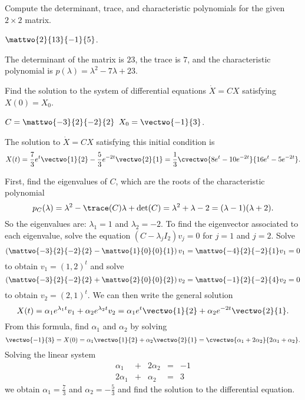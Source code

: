 \documentclass{article}
\begin{document}



\problemlabel

\noindent Compute the determinant, trace, and characteristic polynomials for the given  $2\times 2$ matrix.

\begin{exercise} \label{c6.4.1b}
$\mattwo{2}{13}{-1}{5}$.

\begin{solution}
The determinant of the matrix is $23$, the trace is $7$, and
the characteristic polynomial is $p(\lambda)=\lambda^2-7\lambda+23$.

\end{solution}
\end{exercise}





\problemlabel

\noindent Find the solution to the system of differential equations $\dot{X} = CX$ satisfying $X(0)=X_0$.

\begin{exercise}  \label{c4.10A.1c}
$C = \mattwo{-3}{2}{-2}{2}$ \AND $X_0 = \vectwo{-1}{3}$.

\begin{solution}
\ans The solution to $\dot{X} = CX$ satisfying this
initial condition is
\[
X(t) = \frac{7}{3}e^t\vectwo{1}{2} - \frac{5}{3}e^{-2t}\vectwo{2}{1}
= \frac{1}{3}\cvectwo{8e^t - 10e^{-2t}}{16e^t - 5e^{-2t}}.
\]

\soln First, find the eigenvalues of $C$, which are the roots of the
characteristic polynomial
\[
p_C(\lambda) = \lambda^2 - \trace(C)\lambda + \det(C) =
\lambda^2 + \lambda - 2 = (\lambda - 1)(\lambda + 2).
\]
So the eigenvalues are: $\lambda_1 = 1$ and $\lambda_2 = -2$.
To find the eigenvector associated to each eigenvalue, solve
the equation $(C - \lambda_jI_2)v_j = 0$ for $j = 1$ and $j = 2$.  Solve
\[
\left(\mattwo{-3}{2}{-2}{2} - \mattwo{1}{0}{0}{1}\right)v_1 =
\mattwo{-4}{2}{-2}{1}v_1 = 0
\]
to obtain $v_1 = (1,2)^t$ and solve
\[
\left(\mattwo{-3}{2}{-2}{2} + \mattwo{2}{0}{0}{2}\right)v_2 =
\mattwo{-1}{2}{-2}{4}v_2 = 0
\]
to obtain $v_2 = (2,1)^t$.  We can then write the general solution
\[
X(t) = \alpha_1e^{\lambda_1 t}v_1 + \alpha_2e^{\lambda_2 t}v_2
= \alpha_1e^t\vectwo{1}{2} + \alpha_2e^{-2t}\vectwo{2}{1}.
\]
From this formula, find $\alpha_1$ and $\alpha_2$ by solving
\[
\vectwo{-1}{3} = X(0) = \alpha_1\vectwo{1}{2} + \alpha_2\vectwo{2}{1} =
\cvectwo{\alpha_1 + 2\alpha_2}{2\alpha_1 + \alpha_2}.
\]
Solving the linear system
\[
\begin{array}{rrrrr}
\alpha_1 & + & 2\alpha_2 & = & -1 \\
2\alpha_1 & + & \alpha_2 & = & 3
\end{array}
\]
we obtain $\alpha_1 = \frac{7}{3}$ and $\alpha_2 = -\frac{5}{3}$
and find the solution to the differential equation.


\end{solution}
\end{exercise}
\end{document}
